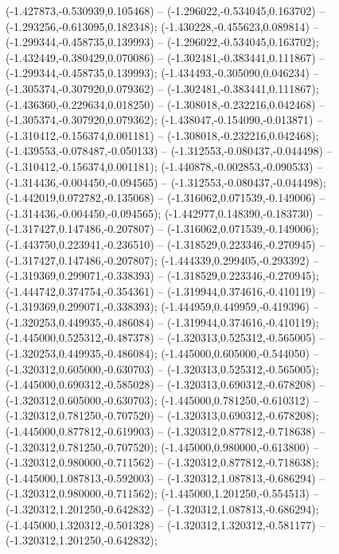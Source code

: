  (-1.427873,-0.530939,0.105468) -- (-1.296022,-0.534045,0.163702) -- (-1.293256,-0.613095,0.182348);
 (-1.430228,-0.455623,0.089814) -- (-1.299344,-0.458735,0.139993) -- (-1.296022,-0.534045,0.163702);
 (-1.432449,-0.380429,0.070086) -- (-1.302481,-0.383441,0.111867) -- (-1.299344,-0.458735,0.139993);
 (-1.434493,-0.305090,0.046234) -- (-1.305374,-0.307920,0.079362) -- (-1.302481,-0.383441,0.111867);
 (-1.436360,-0.229634,0.018250) -- (-1.308018,-0.232216,0.042468) -- (-1.305374,-0.307920,0.079362);
 (-1.438047,-0.154090,-0.013871) -- (-1.310412,-0.156374,0.001181) -- (-1.308018,-0.232216,0.042468);
 (-1.439553,-0.078487,-0.050133) -- (-1.312553,-0.080437,-0.044498) -- (-1.310412,-0.156374,0.001181);
 (-1.440878,-0.002853,-0.090533) -- (-1.314436,-0.004450,-0.094565) -- (-1.312553,-0.080437,-0.044498);
 (-1.442019,0.072782,-0.135068) -- (-1.316062,0.071539,-0.149006) -- (-1.314436,-0.004450,-0.094565);
 (-1.442977,0.148390,-0.183730) -- (-1.317427,0.147486,-0.207807) -- (-1.316062,0.071539,-0.149006);
 (-1.443750,0.223941,-0.236510) -- (-1.318529,0.223346,-0.270945) -- (-1.317427,0.147486,-0.207807);
 (-1.444339,0.299405,-0.293392) -- (-1.319369,0.299071,-0.338393) -- (-1.318529,0.223346,-0.270945);
 (-1.444742,0.374754,-0.354361) -- (-1.319944,0.374616,-0.410119) -- (-1.319369,0.299071,-0.338393);
 (-1.444959,0.449959,-0.419396) -- (-1.320253,0.449935,-0.486084) -- (-1.319944,0.374616,-0.410119);
 (-1.445000,0.525312,-0.487378) -- (-1.320313,0.525312,-0.565005) -- (-1.320253,0.449935,-0.486084);
 (-1.445000,0.605000,-0.544050) -- (-1.320312,0.605000,-0.630703) -- (-1.320313,0.525312,-0.565005);
 (-1.445000,0.690312,-0.585028) -- (-1.320313,0.690312,-0.678208) -- (-1.320312,0.605000,-0.630703);
 (-1.445000,0.781250,-0.610312) -- (-1.320312,0.781250,-0.707520) -- (-1.320313,0.690312,-0.678208);
 (-1.445000,0.877812,-0.619903) -- (-1.320312,0.877812,-0.718638) -- (-1.320312,0.781250,-0.707520);
 (-1.445000,0.980000,-0.613800) -- (-1.320312,0.980000,-0.711562) -- (-1.320312,0.877812,-0.718638);
 (-1.445000,1.087813,-0.592003) -- (-1.320312,1.087813,-0.686294) -- (-1.320312,0.980000,-0.711562);
 (-1.445000,1.201250,-0.554513) -- (-1.320312,1.201250,-0.642832) -- (-1.320312,1.087813,-0.686294);
 (-1.445000,1.320312,-0.501328) -- (-1.320312,1.320312,-0.581177) -- (-1.320312,1.201250,-0.642832);

